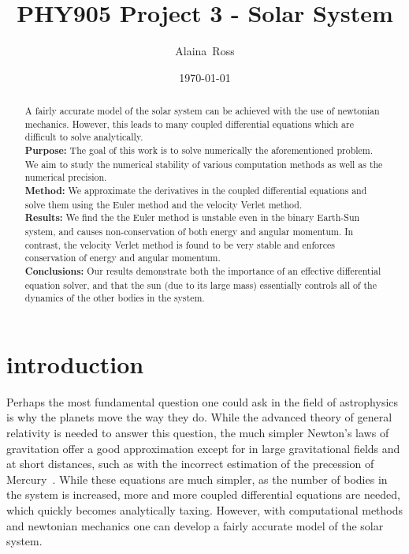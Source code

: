 \documentclass[prc,amsmath,twocolumn,superscriptaddress]{revtex4}
\begin{document}
  \newcommand {\nc} {\newcommand}
  \nc {\Sec} [1] {Sec.~\ref{#1}}
  \nc {\IR} [1] {\textcolor{red}{#1}} 

\title{PHY905 Project 3 - Solar System}


\author{Alaina~Ross}

\date{\today}


\begin{abstract}
  A fairly accurate model of the solar system can be achieved with the use of newtonian mechanics. However, this leads to many coupled differential equations which are difficult to solve analytically.
\\ {\bf Purpose:} The goal of this work is to solve numerically the aforementioned problem. We aim to study the numerical stability of various computation methods as well as the numerical precision.
\\ {\bf Method:} We approximate the derivatives in the coupled differential equations and solve them using the Euler method and the velocity Verlet method.
\\ {\bf Results:} We find the the Euler method is unstable even in the binary Earth-Sun system, and causes non-conservation of both energy and angular momentum. In contrast, the velocity Verlet method is found to be very stable and enforces conservation of energy and angular momentum.
 \\ {\bf Conclusions:} Our results demonstrate both the importance of an effective differential equation solver, and that the sun (due to its large mass) essentially controls all of the dynamics of the other bodies in the system. 
\end{abstract}


\maketitle

\section{introduction}
\label{intro}
Perhaps the most fundamental question one could ask in the field of astrophysics is why the planets move the way they do. While the advanced theory of general relativity is needed to answer this question, the much simpler Newton's laws of gravitation offer a good approximation except for in large gravitational fields and at short distances, such as with the incorrect estimation of the precession of Mercury~\cite{mercury}. While these equations are much simpler, as the number of bodies in the system is increased, more and more coupled differential equations are needed, which quickly becomes analytically taxing. However, with computational methods and newtonian mechanics one can develop a fairly accurate model of the solar system. 
\end{document}
